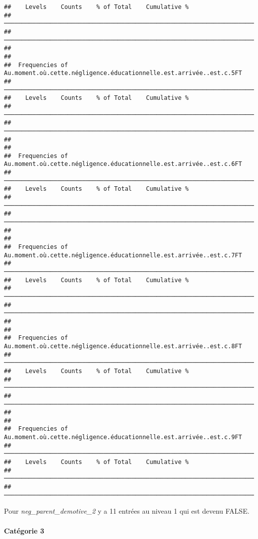 \documentclass[
]{article}
\begin{document}
\begin{verbatim}
##    Levels    Counts    % of Total    Cumulative %   
##  ────────────────────────────────────────────────────────────────────────────────── 
##  ────────────────────────────────────────────────────────────────────────────────── 
## 
## 
##  Frequencies of Au.moment.où.cette.négligence.éducationnelle.est.arrivée..est.c.5FT 
##  ────────────────────────────────────────────────────────────────────────────────── 
##    Levels    Counts    % of Total    Cumulative %   
##  ────────────────────────────────────────────────────────────────────────────────── 
##  ────────────────────────────────────────────────────────────────────────────────── 
## 
## 
##  Frequencies of Au.moment.où.cette.négligence.éducationnelle.est.arrivée..est.c.6FT 
##  ────────────────────────────────────────────────────────────────────────────────── 
##    Levels    Counts    % of Total    Cumulative %   
##  ────────────────────────────────────────────────────────────────────────────────── 
##  ────────────────────────────────────────────────────────────────────────────────── 
## 
## 
##  Frequencies of Au.moment.où.cette.négligence.éducationnelle.est.arrivée..est.c.7FT 
##  ────────────────────────────────────────────────────────────────────────────────── 
##    Levels    Counts    % of Total    Cumulative %   
##  ────────────────────────────────────────────────────────────────────────────────── 
##  ────────────────────────────────────────────────────────────────────────────────── 
## 
## 
##  Frequencies of Au.moment.où.cette.négligence.éducationnelle.est.arrivée..est.c.8FT 
##  ────────────────────────────────────────────────────────────────────────────────── 
##    Levels    Counts    % of Total    Cumulative %   
##  ────────────────────────────────────────────────────────────────────────────────── 
##  ────────────────────────────────────────────────────────────────────────────────── 
## 
## 
##  Frequencies of Au.moment.où.cette.négligence.éducationnelle.est.arrivée..est.c.9FT 
##  ────────────────────────────────────────────────────────────────────────────────── 
##    Levels    Counts    % of Total    Cumulative %   
##  ────────────────────────────────────────────────────────────────────────────────── 
##  ──────────────────────────────────────────────────────────────────────────────────
\end{verbatim}

Pour \emph{neg\_parent\_demotive\_2} y a 11 entrées au niveau 1 qui est
devenu FALSE.

\hypertarget{catuxe9gorie-3-6}{%
\paragraph{Catégorie 3}\label{catuxe9gorie-3-6}}
\end{document}
